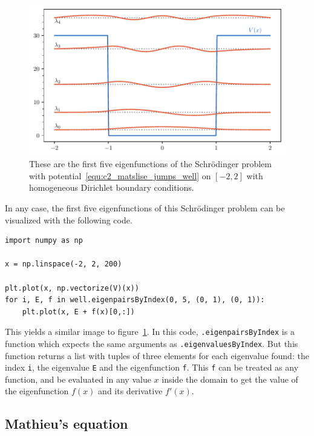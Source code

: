 \begin{figure}
    \begin{center}
        \includegraphics[width=\textwidth]{img/chapter2/matslise_jumps_eigenfunctions.pdf}
    \end{center}
    \caption{These are the first five eigenfunctions of the Schrödinger problem with potential~\eqref{equ:c2_matslise_jumps_well} on $[-2,2]$ with homogeneous Dirichlet boundary conditions.}
    \label{fig:c2_matslise_jumps_eigenfunctions}
\end{figure}

In any case, the first five eigenfunctions of this Schrödinger problem can be visualized with the following code.
\begin{verbatim}
import numpy as np

x = np.linspace(-2, 2, 200)

plt.plot(x, np.vectorize(V)(x))
for i, E, f in well.eigenpairsByIndex(0, 5, (0, 1), (0, 1)):
    plt.plot(x, E + f(x)[0,:])
\end{verbatim}
This yields a similar image to figure~\ref{fig:c2_matslise_jumps_eigenfunctions}. In this code, \texttt{.eigenpairsByIndex} is a function which expects the same arguments as \texttt{.eigenvaluesByIndex}. But this function returns a list with tuples of three elements for each eigenvalue found: the index \texttt{i}, the eigenvalue \texttt{E} and the eigenfunction \texttt{f}. This \texttt{f} can be treated as any \lpython{} function, and be evaluated in any value $x$ inside the domain to get the value of the eigenfunction $f(x)$ and its derivative $f'(x)$.

\subsection{Mathieu's equation}\label{sec:c2_numerical_experiments_mathieu}

